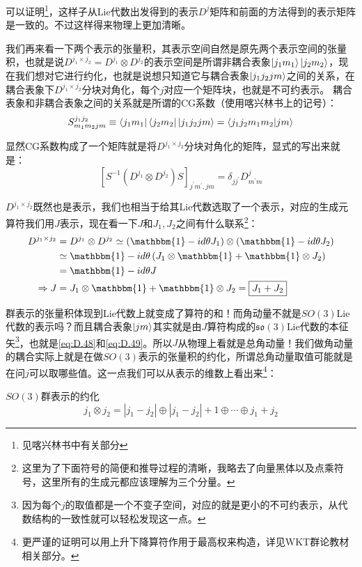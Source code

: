 可以证明\footnote{见喀兴林书中有关部分}，这样子从Lie代数出发得到的表示$D^j$矩阵和前面的方法得到的表示矩阵是一致的。不过这样得来物理上更加清晰。

我们再来看一下两个表示的张量积，其表示空间自然是原先两个表示空间的张量积，也就是说$D^{j_1\times j_2}=D^{j_1}\otimes D^{j_2}$的表示空间是所谓非耦合表象$\ket{j_1m_1}\ket{j_2m_2}$，现在我们想对它进行约化，也就是说想只知道它与耦合表象$\ket{j_1j_2jm}$之间的关系，在耦合表象下$D^{j_1\times j_2}$分块对角化，每个$j$对应一个矩阵块，也就是不可约表示。
耦合表象和非耦合表象之间的关系就是所谓的CG系数（使用喀兴林书上的记号）：
\begin{equation}
	S_{m_1m_2jm}^{j_1j_2}\equiv \bra{j_1m_1}\bra{j_2m_2}\ket{j_1j_2jm}=\braket{j_1j_2m_1m_2|jm}
\end{equation}

显然CG系数构成了一个矩阵就是将$D^{j_1\times j_2}$分块对角化的矩阵，显式的写出来就是：
\begin{equation}
	\left[S^{-1}(D^{j_1}\otimes D^{j_2})S\right]_{j^\prime m^\prime,jm}=\delta_{jj^\prime }D^{j}_{m^\prime m}
\end{equation}

$D^{j_1\times j_2}$既然也是表示，我们也相当于给其Lie代数选取了一个表示，对应的生成元算符我们用$J$表示，现在看一下$J$和$J_1,J_2$之间有什么联系\footnote{这里为了下面符号的简便和推导过程的清晰，我略去了向量黑体以及点乘符号，这里所有的生成元都应该理解为三个分量。}：
\begin{equation}
	\begin{aligned}
		D^{j_1\times j_2}&=D^{j_1}\otimes D^{j_2}\simeq\left(\mathbbm{1}-id\theta J_1\right)\otimes\left(\mathbbm{1}-id\theta J_2\right)\\
		&\simeq\mathbbm{1}-id\theta\left( J_1\otimes \mathbbm{1}+\mathbbm{1}\otimes J_2\right)\\
		&=\mathbbm{1}-id\theta J\\
		\Rightarrow J&= J_1\otimes \mathbbm{1}+\mathbbm{1}\otimes J_2=\boxed{J_1+J_2}
	\end{aligned}
\end{equation}

群表示的张量积体现到Lie代数上就变成了算符的和！而角动量不就是$SO(3)$Lie代数的表示吗？而且耦合表象$\ket{jm}$其实就是由$J$算符构成的$\mathfrak{so}(3)$Lie代数的本征矢\footnote{因为每个$j$的取值都是一个不变子空间，对应的就是更小的不可约表示，从代数结构的一致性就可以轻松发现这一点。}，也就是\ref{eq:D.48}和\ref{eq:D.49}。所以$J$从物理上看就是总角动量！我们做角动量的耦合实际上就是在做$SO(3)$表示的张量积的约化，所谓总角动量取值可能就是在问$j$可以取哪些值。这一点我们可以从表示的维数上看出来\footnote{更严谨的证明可以用上升下降算符作用于最高权来构造，详见WKT群论教材相关部分。}：
\begin{theorem}{$SO(3)$群表示的约化}
	\begin{equation}
		j_1\otimes j_2=|j_1-j_2|\oplus|j_1-j_2|+1\oplus\cdots\oplus j_1+j_2 
	\end{equation}
\end{theorem}

